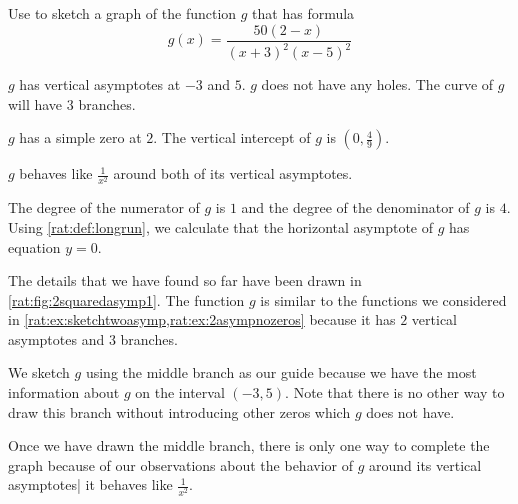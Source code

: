  \begin{pccexample}\label{rat:ex:2squaredasymp}
	 Use  to sketch a graph of the function $g$
	 that has formula
	 \[
		 g(x)=\frac{50(2-x)}{(x+3)^2(x-5)^2}
	 \]
	 \begin{pccsolution}
		 \begin{steps}
			 \item $g$ has vertical asymptotes at $-3$ and $5$. $g$ does
			 not have any holes. The curve of $g$ will have $3$ branches.
			 \item $g$ has a simple zero at $2$. The vertical intercept of $g$ is
			 $\left( 0,\frac{4}{9} \right)$.
			 \item $g$ behaves like $\frac{1}{x^2}$ around both of its
			 vertical asymptotes.
			 \item The degree of the numerator of $g$ is $1$ and the degree of the denominator
			 of $g$ is $4$. Using \vref{rat:def:longrun}, we calculate that
			 the horizontal asymptote of $g$ has equation $y=0$.
			 \item The details that we have found so far have been drawn in
			 \cref{rat:fig:2squaredasymp1}. The function $g$ is similar to the functions
			 we considered in \cref{rat:ex:sketchtwoasymp,rat:ex:2asympnozeros} because
			 it has $2$ vertical asymptotes and $3$ branches.

			 We sketch $g$ using the middle branch as our guide because we have the most information
			 about $g$ on the interval $(-3,5)$. Note that there is no other way to draw this branch
			 without introducing other zeros which $g$ does not have.

			 Once we have drawn the middle branch, there is only one way to complete the graph
			 because of our observations about the behavior of $g$ around its vertical asymptotes| it
			 behaves like $\frac{1}{x^2}$.

		 \end{steps}
	 \end{pccsolution}
 \end{pccexample}

